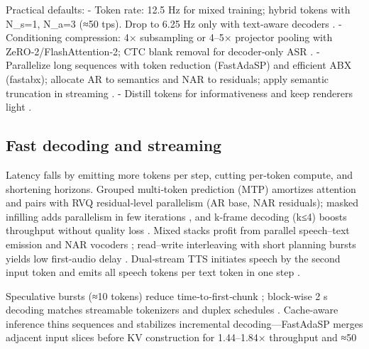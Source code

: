 Practical defaults:
- Token rate: 12.5 Hz for mixed training; hybrid tokens with N_s=1, N_a=3 (≈50 tps). Drop to 6.25 Hz only with text‑aware decoders \cite{yang2025diffsoundstreamefficientspeechtokenizati,wang2025tadicodectextawarediffusionspeechtokeniz}.
- Conditioning compression: 4× subsampling or 4–5× projector pooling with ZeRO‑2/FlashAttention‑2; CTC blank removal for decoder‑only ASR \cite{wang2023slmbridgethingapbetweenspeechtextfoundat,nguyen2025qwenvsgemmaintegrationwhispercomparative,tsunoo2024decoderonlyarchitecturespeechrecognition}.
- Parallelize long sequences with token reduction (FastAdaSP) and efficient ABX (fastabx); allocate AR to semantics and NAR to residuals; apply semantic truncation in streaming \cite{lu2024fastadaspmultitaskadaptedefficientinfere,poli2025fastabxlibraryefficientcomputationabxdis}.
- Distill tokens for informativeness and keep renderers light \cite{ahasan2025dmcodecdistillingmultimodalrepresentatio,wang2025tadicodectextawarediffusionspeechtokeniz}.

\subsection{Fast decoding and streaming} \label{subsec:Fast decoding and streaming}
Latency falls by emitting more tokens per step, cutting per‑token compute, and shortening horizons. Grouped multi‑token prediction (MTP) amortizes attention and pairs with RVQ residual‑level parallelism (AR base, NAR residuals); masked infilling adds parallelism in few iterations \cite{li2024masksrmaskedlanguagemodelfullbandspeechr}, and k‑frame decoding (k≤4) boosts throughput without quality loss \cite{bai2025dmelspeechtokenizationmadesimple}. Mixed stacks profit from parallel speech–text emission and NAR vocoders \cite{tan2025drvoiceparallelspeechtextvoiceconversati}; read–write interleaving with short planning bursts yields low first‑audio delay \cite{fang2025llamaomni2llmbasedrealtimespokenchatbota}. Dual‑stream TTS initiates speech by the second input token and emits all speech tokens per text token in one step \cite{sheng2025syncspeechlowlatencyefficientdualstreamt}.

Speculative bursts (≈10 tokens) reduce time‑to‑first‑chunk \cite{long2025vitaaudiofastinterleavedcrossmodaltokeng}; block‑wise 2 s decoding matches streamable tokenizers and duplex schedules \cite{zeng2024scalingspeechtextpretrainingsyntheticint}. Cache‑aware inference thins sequences and stabilizes incremental decoding—FastAdaSP merges adjacent input slices before KV construction for 1.44–1.84× throughput and ≈50%

